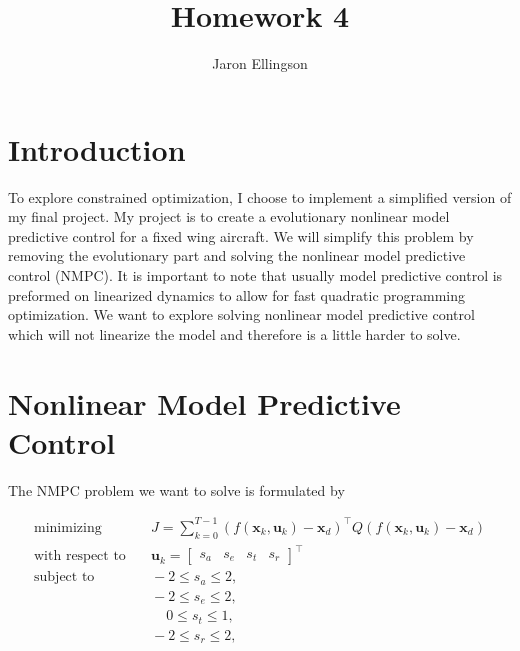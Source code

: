 \documentclass{article}
\begin{document}
\title{Homework 4}
\author{Jaron Ellingson}
\maketitle


\section*{Introduction}

To explore constrained optimization, I choose to implement a simplified version of my final project. My project is to create a evolutionary nonlinear model predictive control for a fixed wing aircraft. We will simplify this problem by removing the evolutionary part and solving the nonlinear model predictive control (NMPC). It is important to note that usually model predictive control is preformed on linearized dynamics to allow for fast quadratic programming optimization. We want to explore solving nonlinear model predictive control which will not linearize the model and therefore is a little harder to solve.



\section*{Nonlinear Model Predictive Control}

The NMPC problem we want to solve is formulated by

\begin{equation*}
\begin{aligned}
\text{minimizing} & \quad J= \sum_{k=0}^{T-1} (f(\mathbf{x}_k,\mathbf{u}_k)-\mathbf{x}_{d})^{\top} Q (f(\mathbf{x}_k,\mathbf{u}_k)-\mathbf{x}_{d}) \\
\text{with respect to} & \quad \mathbf{u}_k =\begin{bmatrix}s_{a} & s_{e} & s_{t} & s_{r}\end{bmatrix}^{\top} \\
\text{subject to} & \quad -2 \le s_{a} \le 2, \\
& \quad -2 \le s_{e} \le 2, \\
& \quad \hspace{13pt} 0 \le s_{t} \le 1, \\
& \quad -2 \le s_{r} \le 2,
\end{aligned}
\end{equation*}
\end{document}
